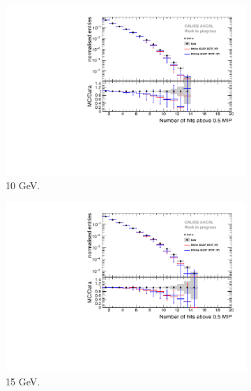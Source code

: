 \begin{figure}[htbp!]
	\begin{subfigure}[t]{0.5\textwidth}
		\centering
		\includegraphics[width=1\textwidth]{chap5/fig_AHCAL_timing/Electrons/Comparison_SimData_Electrons_nHits_10GeV.pdf}
		\caption{10 GeV.}\label{fig:elec_sim_data_nHits_10GeV}
	\end{subfigure}
	\hfill
	\begin{subfigure}[t]{0.5\textwidth}
		\centering
		\includegraphics[width=1\textwidth]{chap5/fig_AHCAL_timing/Electrons/Comparison_SimData_Electrons_nHits_15GeV.pdf}
		\caption{15 GeV.}\label{fig:elec_sim_data_nHits_15GeV}
	\end{subfigure}
	\hfill
	\begin{subfigure}[t]{0.5\textwidth}
		\centering

\end{subfigure}
\end{figure}
